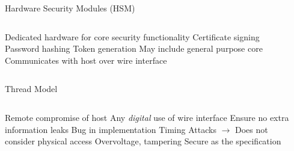 \begin{frame}{Hardware Security Modules (HSM)}
\begin{columns}
  \centering
  \begin{outline}
  \1 Dedicated hardware for core security functionality
  \2 Certificate signing
  \2 Password hashing
  \2 Token generation
  \1 May include general purpose core
  \1 Communicates with host over wire interface
  \end{outline}

  \centering
  \begin{center}


  \end{center}
\end{columns}
\end{frame}

\begin{frame}{Thread Model}
\begin{columns}
  \centering
  \begin{outline}
  \1 Remote compromise of host 
  \1 Any \textit{digital} use of wire interface
  \1 Ensure no extra information leaks
  \2 Bug in implementation
  \2 Timing Attacks $\rightarrow$ 
  \1 Does not consider physical access
  \2 Overvoltage, tampering
  \2 Secure as the specification
  \end{outline}

  \centering
  \begin{center}

  \end{center}
\end{columns}
\end{frame}

